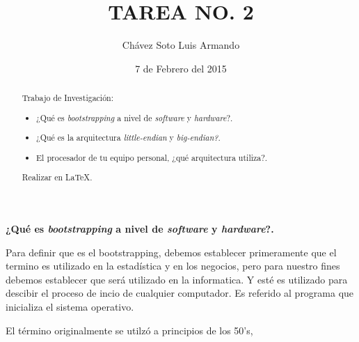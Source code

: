 \documentclass[11pt,a4paper]{article}
\author{Chávez Soto Luis Armando}
\title{TAREA NO. 2}
\date{7 de Febrero del 2015}
\begin{document}
	\maketitle

\begin{abstract}
Trabajo de Investigación:

	\begin{itemize}
		\item ¿Qué es \textit{bootstrapping} a nivel de \textit{software} y \textit{hardware}?.
		\item ¿Qué es la arquitectura \textit{little-endian} y\textit{ big-endian?}.
		\item El procesador de tu equipo personal, ¿qué arquitectura utiliza?.	
	\end{itemize}
	 Realizar en LaTeX. 
\end{abstract}


\textbf{¿Qué es \textit{bootstrapping} a nivel de \textit{software} y \textit{hardware}?.}
 
 
Para definir que es el bootstrapping, debemos establecer primeramente que el termino es utilizado en la estadística y en los negocios, pero para nuestro fines debemos establecer que será utilizado en la informatica. Y esté es utilizado para descibir el proceso de incio de cualquier computador. Es referido al programa que inicializa el sistema operativo.

El término originalmente se utilzó a principios de los 50's, 
\end{document}
